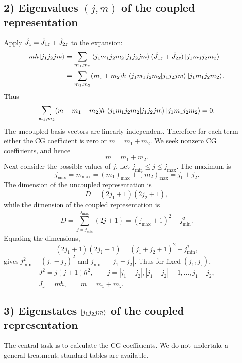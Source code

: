 \subsection*{2) Eigenvalues $(j,m)$ of the coupled representation}
Apply $\hat{J}_z=\hat{J}_{1z}+\hat{J}_{2z}$ to the expansion:
\begin{equation}\begin{aligned}
m\hbar\left|j_1j_2jm\right\rangle
&=\sum_{m_1,m_2}\left\langle j_1m_1j_2m_2\middle|j_1j_2jm\right\rangle
(\hat{J}_{1z}+\hat{J}_{2z})\left|j_1m_1j_2m_2\right\rangle\\
&=\sum_{m_1,m_2}(m_1+m_2)\hbar\,
\left\langle j_1m_1j_2m_2\middle|j_1j_2jm\right\rangle\left|j_1m_1j_2m_2\right\rangle.
\end{aligned}\end{equation}
Thus
\begin{equation}
\sum_{m_1,m_2}(m-m_1-m_2)\hbar\,
\left\langle j_1m_1j_2m_2\middle|j_1j_2jm\right\rangle\left|j_1m_1j_2m_2\right\rangle=0.
\end{equation}
The uncoupled basis vectors are linearly independent. Therefore for each term either the CG coefficient is zero or $m=m_1+m_2$. We seek nonzero CG coefficients, and hence
\begin{equation}
\boxed{m=m_1+m_2.}
\end{equation}
Next consider the possible values of $j$. Let $j_{\min}\le j\le j_{\max}$. The maximum is
\begin{equation}
j_{\max}=m_{\max}=(m_1)_{\max}+(m_2)_{\max}=j_1+j_2.
\end{equation}
The dimension of the uncoupled representation is
\begin{equation}
D=(2j_1+1)(2j_2+1),
\end{equation}
while the dimension of the coupled representation is
\begin{equation}
D=\sum_{j=j_{\min}}^{j_{\max}}(2j+1)
=(j_{\max}+1)^2-j_{\min}^2.
\end{equation}
Equating the dimensions,
\begin{equation}
(2j_1+1)(2j_2+1)=(j_1+j_2+1)^2-j_{\min}^2,
\end{equation}
gives $j_{\min}^2=(j_1-j_2)^2$ and $j_{\min}=|j_1-j_2|$.
Thus for fixed $(j_1,j_2)$,
\begin{equation}
\boxed{\begin{gathered}
J^2=j(j+1)\hbar^2,\qquad j=|j_1-j_2|,|j_1-j_2|+1,\ldots,j_1+j_2,\\
J_z=m\hbar,\qquad m=m_1+m_2.
\end{gathered}}
\end{equation}

\subsection*{3) Eigenstates $\left|j_1j_2jm\right\rangle$ of the coupled representation}
The central task is to calculate the CG coefficients. We do not undertake a general treatment; standard tables are available.

